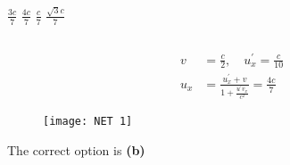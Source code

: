 \begin{enumerate}
\begin{tasks}
	\task[\textbf{A.}] $\frac{3 c}{7}$
	\task[\textbf{B.}]$\frac{4 c}{7}$
	\task[\textbf{C.}]$\frac{c}{7}$
	\task[\textbf{D.}] $\frac{\sqrt{3} c}{7}$
\end{tasks}
\begin{answer}$\left. \right. $	\\
\begin{minipage}{0.5\textwidth}
		\begin{align*}
	v&=\frac{c}{2}, \quad u_{x}^{\prime}=\frac{c}{10}\\
	u_{x}&=\frac{u_{x}^{\prime}+v}{1+\frac{u^{\prime} v_{x}}{c^{2}}}=\frac{4 c}{7}
	\end{align*}
\end{minipage}
	\begin{minipage}{0.5\textwidth}
	\begin{figure}[H]
		\centering
		\texttt{[image: NET 1]}
	\end{figure}
	\end{minipage}
The correct option is \textbf{(b)}
\end{answer}


\end{enumerate}

